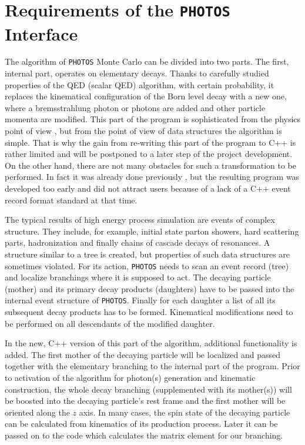 \documentclass[]{Photos_interface_design}
\begin{document}
\section{Requirements of the {\tt PHOTOS} Interface}
\label{sec:requrements}
The algorithm of {\tt PHOTOS} Monte Carlo can be divided into two parts.
The first, internal part, operates on elementary decays. Thanks to carefully 
studied properties of the 
QED (scalar QED) algorithm, with certain probability, 
it replaces the kinematical configuration of the Born level decay with a new one, 
where a bremsstrahlung photon or photons
are added and other particle momenta are modified. This part of the program is sophisticated from the physics 
point of view \cite{Nanava:2006vv,Golonka:2006tw},
but from the point of view of data structures the algorithm is simple.
That is why the gain from re-writing this part of the program to C++ is rather
limited and will be postponed to a later step of the project development.
On the other hand, there are not many obstacles for such a transformation to be
performed. In fact it was already done
previously \cite{photosplus}, but the resulting program was developed too early 
and did not attract users because of a lack of a C++ event record format standard at that time.

The typical results of high energy process simulation are events of complex structure.
They include, for example, initial state parton showers, hard scattering parts,
hadronization and finally chains of cascade decays of resonances. 
A structure similar to a tree is created, but properties of such data structures
are sometimes violated.
For its action, {\tt PHOTOS} needs to scan an event record (tree) 
and localize branchings where
it is supposed to act. The decaying particle (mother) and its primary decay products
(daughters) have to be passed into the internal event structure of {\tt PHOTOS}. 
Finally for each daughter a list of all its subsequent decay products has to be 
formed. Kinematical modifications need to be performed on all descendants of the modified daughter.

In the new, C++ version of this part of the algorithm, additional functionality
is added.
The first mother of the decaying particle will be localized and passed together with  
the elementary branching to the internal part of the program. 
Prior to activation of the algorithm for  photon(s) generation and kinematic construction,
 the whole decay branching 
(supplemented with its mother(s))
will be boosted into the decaying particle's rest frame and the first mother
will be oriented along the $z$ axis. 
In many cases, the spin state of the decaying particle  can be calculated from kinematics of its production process.
Later it can be passed on to the code which calculates the matrix element for our branching.
\end{document}
